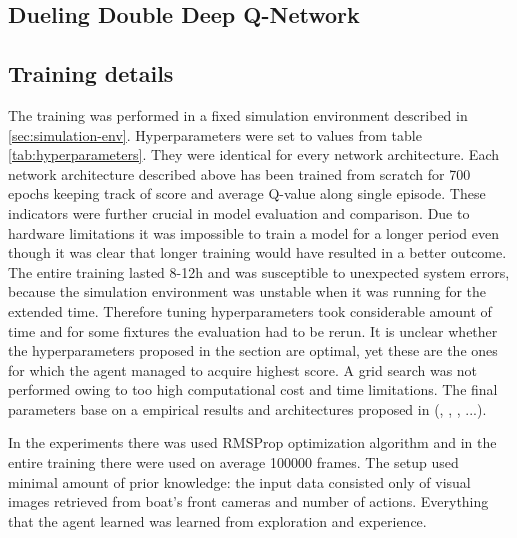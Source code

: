 \subsection{Dueling Double Deep Q-Network}
\label{sub:dueling-double-deep-q-network}

\subsection{Training details}
\label{sub:training-details}

The training was performed in a fixed simulation environment described in \ref{sec:simulation-env}. Hyperparameters were set to values from table \ref{tab:hyperparameters}. They were identical for every network architecture. Each network architecture described above has been trained from scratch for 700 epochs keeping track of score and average Q-value along single episode. These indicators were further crucial in model evaluation and comparison. Due to hardware limitations it was impossible to train a model for a longer period even though it was clear that longer training would have resulted in a better outcome. The entire training lasted 8-12h and was susceptible to unexpected system errors, because the simulation environment was unstable when it was running for the extended time. Therefore tuning hyperparameters took considerable amount of time and for some fixtures the evaluation had to be rerun. It is unclear whether the hyperparameters proposed in the section are optimal, yet these are the ones for which the agent managed to acquire highest score. A grid search was not performed owing to too high computational cost and time limitations. The final parameters base on a empirical results and architectures proposed in (\cite{DQNAtari}, \cite{2020DuckieTown}, \cite{DBLP:journals/corr/HasseltGS15}, ...).

In the experiments there was used RMSProp optimization algorithm and in the entire training there were used on average 100000 frames. The setup used minimal amount of prior knowledge: the input data consisted only of visual images retrieved from boat's front cameras and number of actions. Everything that the agent learned was learned from exploration and experience.